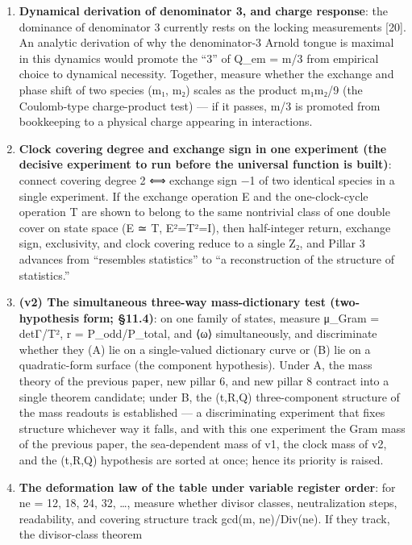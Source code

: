 \documentclass[
]{article}
\providecommand{\tightlist}{%
  \setlength{\itemsep}{0pt}\setlength{\parskip}{0pt}}
\begin{document}
\begin{enumerate}
\def\labelenumi{\arabic{enumi}.}
\tightlist
\item
  \textbf{Dynamical derivation of denominator 3, and charge response}:
  the dominance of denominator 3 currently rests on the locking
  measurements {[}20{]}. An analytic derivation of why the denominator-3
  Arnold tongue is maximal in this dynamics would promote the ``3'' of
  Q\_em = m/3 from empirical choice to dynamical necessity. Together,
  measure whether the exchange and phase shift of two species (m₁, m₂)
  scales as the product m₁m₂/9 (the Coulomb-type charge-product test)
  --- if it passes, m/3 is promoted from bookkeeping to a physical
  charge appearing in interactions.
\item
  \textbf{Clock covering degree and exchange sign in one experiment (the
  decisive experiment to run before the universal function is built)}:
  connect covering degree 2 ⟺ exchange sign −1 of two identical species
  in a single experiment. If the exchange operation E and the
  one-clock-cycle operation T are shown to belong to the same nontrivial
  class of one double cover on state space (E ≃ T, E²=T²=I), then
  half-integer return, exchange sign, exclusivity, and clock covering
  reduce to a single Z₂, and Pillar 3 advances from ``resembles
  statistics'' to ``a reconstruction of the structure of statistics.''
\item
  \textbf{(v2) The simultaneous three-way mass-dictionary test
  (two-hypothesis form; §11.4)}: on one family of states, measure
  μ\_Gram = detΓ/T², r = P\_odd/P\_total, and ⟨ω⟩ simultaneously, and
  discriminate whether they (A) lie on a single-valued dictionary curve
  or (B) lie on a quadratic-form surface (the component hypothesis).
  Under A, the mass theory of the previous paper, new pillar 6, and new
  pillar 8 contract into a single theorem candidate; under B, the
  (t,R,Q) three-component structure of the mass readouts is established
  --- a discriminating experiment that fixes structure whichever way it
  falls, and with this one experiment the Gram mass of the previous
  paper, the sea-dependent mass of v1, the clock mass of v2, and the
  (t,R,Q) hypothesis are sorted at once; hence its priority is raised.
\item
  \textbf{The deformation law of the table under variable register
  order}: for ne = 12, 18, 24, 32, \ldots, measure whether divisor
  classes, neutralization steps, readability, and covering structure
  track gcd(m, ne)/Div(ne). If they track, the divisor-class theorem

\end{enumerate}
\end{document}
